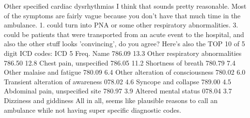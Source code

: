 Other specified cardiac dysrhythmias I think that sounds pretty reasonable. Most of the symptoms are fairly vague because you don't have that much time in the ambulance. 1. could turn into PNA or some other respiratory abnormalities. 3. could be patients that were transported from an acute event to the hospital, and also the other stuff looks 'convincing', do you agree?\markdownRendererOlItemEnd 
\markdownRendererOlEndTight \markdownRendererInterblockSeparator
{}Here's also the TOP 10 of 5 digit ICD codes:\markdownRendererInterblockSeparator
{}ICD 5 Freq. Name 786.09 13.3\markdownRendererPercentSign{} Other respiratory abnormalities 786.50 12.8\markdownRendererPercentSign{} Chest pain, unspecified 786.05 11.2\markdownRendererPercentSign{} Shortness of breath 780.79 7.4\markdownRendererPercentSign{} Other malaise and fatigue 780.09 6.4\markdownRendererPercentSign{} Other alteration of consciousness 780.02 6.0\markdownRendererPercentSign{} Transient alteration of awareness 078.02 4.6\markdownRendererPercentSign{} Syncope and collapse 789.00 4.5\markdownRendererPercentSign{} Abdominal pain, unspecified site 780.97 3.9\markdownRendererPercentSign{} Altered mental status 078.04 3.7\markdownRendererPercentSign{} Dizziness and giddiness All in all, seems like plausible reasons to call an ambulance while not having super specific diagnostic codes.\relax